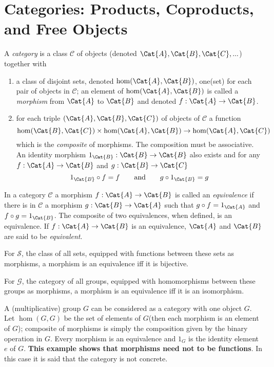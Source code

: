 \section{Categories: Products, Coproducts, and Free Objects}
\begin{definition}
	A \textit{category} is a class $ \mathscr{C} $ of objects (denoted $ \Cat{A},\Cat{B}, \Cat{C}, ... $) together with
	\begin{enumerate}
		\item a class of disjoint sets, denoted $ \hom(\Cat{A},\Cat{B}) $, one(set) for each pair of objects in $ \mathscr{C} $; an element of $ \hom (\Cat{A},\Cat{B}) $ is called a \textit{morphism} from $ \Cat{A} $ to $ \Cat{B} $ and denoted $ f:\Cat{A}\to \Cat{B} $. 
		\item for each triple $ (\Cat{A},\Cat{B},\Cat{C}) $ of objects of $ \mathscr{C} $ a function
		\begin{equation}
			\hom(\Cat{B},\Cat{C}) \times \hom(\Cat{A},\Cat{B})  \to \hom(\Cat{A},\Cat{C}) \nonumber
		\end{equation}
		which is the \textit{composite} of morphisms. The composition must be associative. An identity morphism $ 1_{\Cat{B}}:\Cat{B} \to \Cat{B} $ also exists and for any $ f:\Cat{A}\to \Cat{B} $ and $ g:\Cat{B}\to \Cat{C} $
		\begin{equation}
			1_{\Cat{B}} \circ f = f\qquad \text{and}\qquad g \circ 1_{\Cat{B}} = g \nonumber
		\end{equation}
	\end{enumerate}
\end{definition}
\begin{definition}
	In a category $ \mathscr{C} $ a morphism $ f:\Cat{A} \to \Cat{B} $ is called an \textit{equivalence} if there is in $ \mathscr{C} $ a morphism $ g:\Cat{B} \to \Cat{A}  $ such that $ g \circ f=1_{\Cat{A}} $ and $ f \circ g=1_{\Cat{B}} $. The composite of two equivalences, when defined, is an equivalence. If $ f:\Cat{A} \to \Cat{B}$ is an equivalence, $ \Cat{A} $ and $ \Cat{B} $ are said to be \textit{equivalent}.
\end{definition}
\begin{Example}
	For $ \mathscr{S} $, the class of all sets, equipped with functions between these sets as morphisms, a morphism is an equivalence iff it is bijective. 
\end{Example}
\begin{Example}
	For $ \mathscr{G} $, the category of all groups, equipped with homomorphisms between these groups as morphisms, a morphism is an equivalence iff it is an isomorphism.
\end{Example}
\begin{Example}
	A (multiplicative) group $ G $ can be considered as a category with one object $ G $. Let $ \hom(G,G) $ be the set of elements of $ G $(then each morphism is an element of $ G $); composite of morphisms is simply the composition given by the binary operation in $ G $. Every morphism is an equivalence and $ 1_G $ is the identity element $ e $ of $ G $. \textbf{This example shows that morphisms need not to be functions}. In this case it is said that the category is not concrete.
\end{Example}

